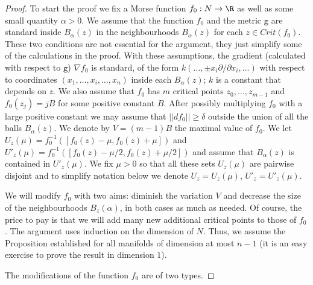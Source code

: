 \begin{proof}  To start the proof we fix a Morse function $f_{0}:N\to \R$
as well as some small quantity $\alpha>0$. We assume that the function $f_{0}$
and the metric  $\mathtt{g}$ are standard inside $B_{\alpha}(z)$ in the neighbourhoods $B_{\alpha}(z)$ for each $z\in Crit(f_{0})$. These two conditions
are not essential for the argument, they just simplify some of the calculations
in the proof. With these assumptions,  the gradient (calculated with respect to $\texttt{g}$) 
$\nabla f_{0}$ is standard, of the form $k(\ldots, \pm x_{i}\partial/\partial x_{i},\ldots)$ with respect to coordinates $(x_{1},\ldots, x_{i},\ldots, x_{n})$
inside each $B_{\alpha}(z)$; $k$ is a constant that depends on $z$. We also assume that $f_{0}$ has $m$ critical points $z_{0},\ldots, z_{m-1}$ and $f_{0}(z_{j})=jB$ for some positive constant $B$.
After possibly
multiplying $f_{0}$ with a large positive constant we may assume that $||df_{0}||\geq \delta$ outside the union of all the balls $B_{\alpha}(z)$.  We denote by $V=(m-1)B$ the maximal value of $f_{0}$.  We let $U_{z}(\mu)=f_{0}^{-1}([f_{0}(z)-\mu, f_{0}(z)+\mu])$ and 
$U'_{z}(\mu)=f_{0}^{-1}([f_{0}(z)-\mu/2, f_{0}(z)+\mu/2])$ and assume that $B_{\alpha}(z)$
is contained in $U'_{z}(\mu)$. We fix $\mu>0$ so  that all
these sets $U_{z}(\mu)$ are pairwise disjoint and to simplify notation below
we denote $U_{z}=U_{z}(\mu)$, $U'_{z}=U'_{z}(\mu)$.

We will modify $f_{0}$ with two aims:  diminish the variation $V$ and decrease the size of the neighbourhoods $B_{z}(\alpha)$, in both cases as much as needed. Of course, the price to pay is that we will add many new additional critical points
to those of $f_{0}$. The argument uses induction on the dimension of $N$. Thus, we assume the Proposition established for all manifolds of dimension at most $n-1$ (it is an easy exercise to prove the result in dimension $1$).

The modifications of the function $f_{0}$ are of two types. 


\end{proof}
